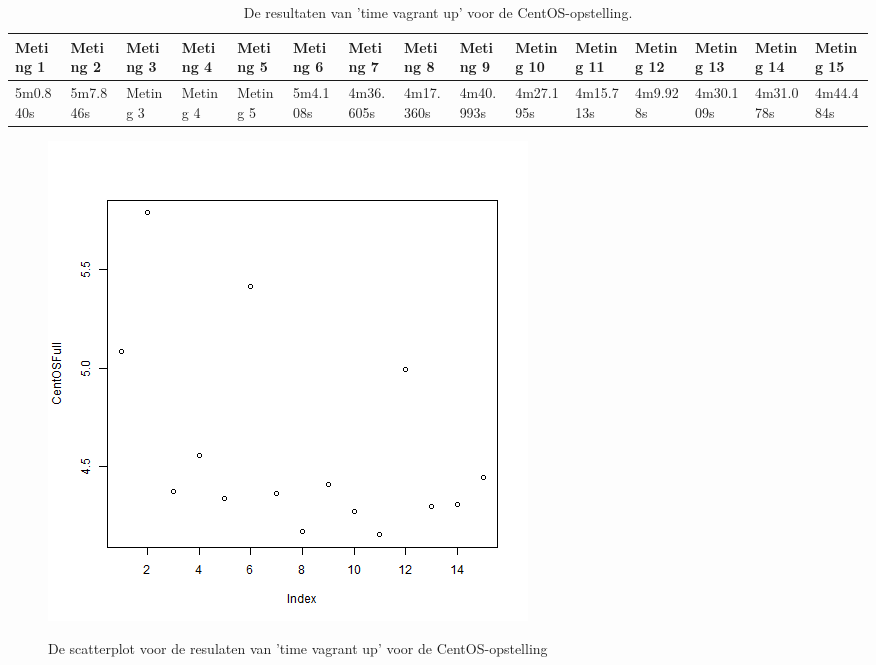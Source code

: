 \begin{table}
	\centering
	\begin{tabular}{lllllllllllllll}
		\hline
		Meting 1 & Meting 2 & Meting 3 & Meting 4 & Meting 5 & Meting 6 & Meting 7 & Meting 8 & Meting 9 & Meting 10 & Meting 11 & Meting 12 & Meting 13 & Meting 14 & Meting 15 \\
		\hline
		5m0.840s & 5m7.846s & Meting 3 & Meting 4 & Meting 5 & 5m4.108s & 4m36.605s & 4m17.360s & 4m40.993s & 4m27.195s & 4m15.713s & 4m9.928s & 4m30.109s & 4m31.078s & 4m44.484s \\
		\hline
	\end{tabular}
\caption{De resultaten van 'time vagrant up' voor de CentOS-opstelling.}
\label{tab:timevagrantupcentos}
\end{table}


\begin{figure}
	\centering
	\caption{De scatterplot voor de resulaten van 'time vagrant up' voor de CentOS-opstelling}
	\includegraphics[scale=0.5]{img/centosfullplot.png}
	\label{fig:centosupplot}
\end{figure}

